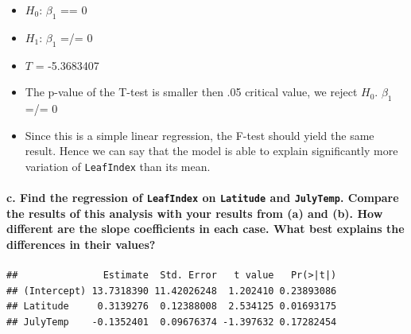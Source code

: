\documentclass[]{article}
\newenvironment{Shaded}{\begin{snugshade}}{\end{snugshade}}
\newcommand{\KeywordTok}[1]{\textcolor[rgb]{0.13,0.29,0.53}{\textbf{#1}}}
\newcommand{\DataTypeTok}[1]{\textcolor[rgb]{0.13,0.29,0.53}{#1}}
\newcommand{\StringTok}[1]{\textcolor[rgb]{0.31,0.60,0.02}{#1}}
\newcommand{\OperatorTok}[1]{\textcolor[rgb]{0.81,0.36,0.00}{\textbf{#1}}}
\newcommand{\NormalTok}[1]{#1}
\providecommand{\tightlist}{%
  \setlength{\itemsep}{0pt}\setlength{\parskip}{0pt}}
\let\oldparagraph\paragraph
\renewcommand{\paragraph}[1]{\oldparagraph{#1}\mbox{}}
\begin{document}
\begin{itemize}
\tightlist
\item
  \(H_{0}\): \(\beta_{1}\) == 0
\item
  \(H_{1}\): \(\beta_{1}\) =/= 0
\item
  \(T\) = -5.3683407
\item
  The p-value of the T-test is smaller then .05 critical value, we
  reject \(H_{0}\). \(\beta_{1}\) =/= 0
\item
  Since this is a simple linear regression, the F-test should yield the
  same result. Hence we can say that the model is able to explain
  significantly more variation of \texttt{LeafIndex} than its mean.
\end{itemize}

\paragraph{\texorpdfstring{c. Find the regression of \texttt{LeafIndex}
on \texttt{Latitude} and \texttt{JulyTemp}. Compare the results of this
analysis with your results from (a) and (b). How different are the slope
coefficients in each case. What best explains the differences in their
values?}{c. Find the regression of LeafIndex on Latitude and JulyTemp. Compare the results of this analysis with your results from (a) and (b). How different are the slope coefficients in each case. What best explains the differences in their values?}}\label{c.-find-the-regression-of-leafindex-on-latitude-and-julytemp.-compare-the-results-of-this-analysis-with-your-results-from-a-and-b.-how-different-are-the-slope-coefficients-in-each-case.-what-best-explains-the-differences-in-their-values}

\begin{Shaded}
\end{Shaded}

\begin{verbatim}
##               Estimate  Std. Error   t value   Pr(>|t|)
## (Intercept) 13.7318390 11.42026248  1.202410 0.23893086
## Latitude     0.3139276  0.12388008  2.534125 0.01693175
## JulyTemp    -0.1352401  0.09676374 -1.397632 0.17282454
\end{verbatim}
\end{document}
